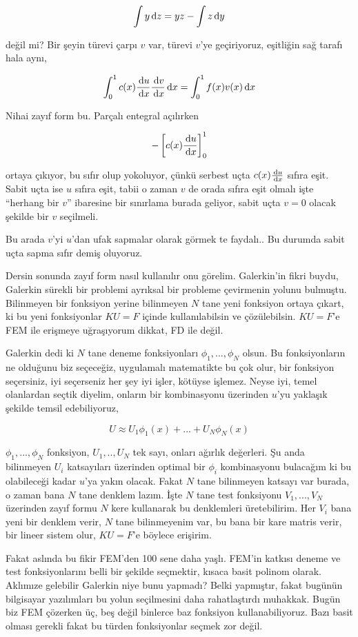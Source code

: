 \documentclass[12pt,fleqn]{article}\usepackage{../../common}
\begin{document}
$$ \int y \,\mathrm{d} z = y  z - \int z \,\mathrm{d} y $$

değil mi? Bir şeyin türevi çarpı $v$ var, türevi $v$'ye geçiriyoruz, eşitliğin
sağ tarafı hala aynı,

$$
\int _{0}^{1} c(x) \frac{\,\mathrm{d} u}{\,\mathrm{d} x} \frac{\,\mathrm{d} v}{\,\mathrm{d} x} \,\mathrm{d} x =
\int_{0}^{1} f(x) v(x) \,\mathrm{d} x
$$

Nihai zayıf form bu. Parçalı entegral açılırken

$$
- \left[ c(x) \frac{\,\mathrm{d} u}{\,\mathrm{d} x}  \right]_{0}^{1}
$$

ortaya çıkıyor, bu sıfır olup yokoluyor, çünkü serbest uçta $c(x) \frac{\,\mathrm{d} u}{\,\mathrm{d} x}$
sıfıra eşit. Sabit uçta ise $u$ sıfıra eşit, tabii o zaman $v$ de orada sıfıra
eşit olmalı işte ``herhang bir $v$'' ibaresine bir sınırlama burada geliyor,
sabit uçta $v=0$ olacak şekilde bir $v$ seçilmeli.

Bu arada $v$'yi $u$'dan ufak sapmalar olarak görmek te faydalı.. Bu durumda
sabit uçta sapma sıfır demiş oluyoruz.

Dersin sonunda zayıf form nasıl kullanılır onu görelim. Galerkin'in fikri buydu,
Galerkin sürekli bir problemi ayrıksal bir probleme çevirmenin yolunu bulmuştu.
Bilinmeyen bir fonksiyon yerine bilinmeyen $N$ tane yeni fonksiyon ortaya
çıkart, ki bu yeni fonksiyonlar $KU = F$ içinde kullanılabilsin ve çözülebilsin.
$KU=F$'e FEM ile erişmeye uğraşıyorum dikkat, FD ile değil.

Galerkin dedi ki $N$ tane deneme fonksiyonları $\phi_1,...,\phi_N$ olsun. Bu
fonksiyonların ne olduğunu biz seçeceğiz, uygulamalı matematikte bu çok olur,
bir fonksiyon seçersiniz, iyi seçerseniz her şey iyi işler, kötüyse işlemez.
Neyse iyi, temel olanlardan seçtik diyelim, onların bir kombinasyonu üzerinden
$u$'yu yaklaşık şekilde temsil edebiliyoruz,

$$
U \approx U_1 \phi_1(x) + ... + U_N \phi_N(x)
$$

$\phi_1,...,\phi_N$ fonksiyon, $U_1,..,U_N$ tek sayı, onları ağırlık değerleri.
Şu anda bilinmeyen $U_i$ katsayıları üzerinden optimal bir $\phi_i$ kombinasyonu
bulacağım ki bu olabileceği kadar $u$'ya yakın olacak. Fakat $N$ tane bilinmeyen
katsayı var burada, o zaman bana $N$ tane denklem lazım. İşte $N$ tane test
fonksiyonu $V_1,...,V_N$ üzerinden zayıf formu $N$ kere kullanarak bu
denklemleri üretebilirim. Her $V_i$ bana yeni bir denklem verir, $N$ tane
bilinmeyenim var, bu bana bir kare matris verir, bir lineer sistem olur, 
$KU = F$'e böylece erişirim.

Fakat aslında bu fikir FEM'den 100 sene daha yaşlı. FEM'in katkısı deneme ve
test fonksiyonlarını belli bir şekilde seçmektir, kısaca basit polinom
olarak. Aklımıze gelebilir Galerkin niye bunu yapmadı? Belki yapmıştır, fakat
bugünün bilgisayar yazılımları bu yolun seçilmesini daha rahatlaştırdı muhakkak.
Bugün biz FEM çözerken üç, beş değil binlerce baz fonksiyon kullanabiliyoruz.
Bazı basit olması gerekli fakat bu türden fonksiyonlar seçmek zor değil.
\end{document}
